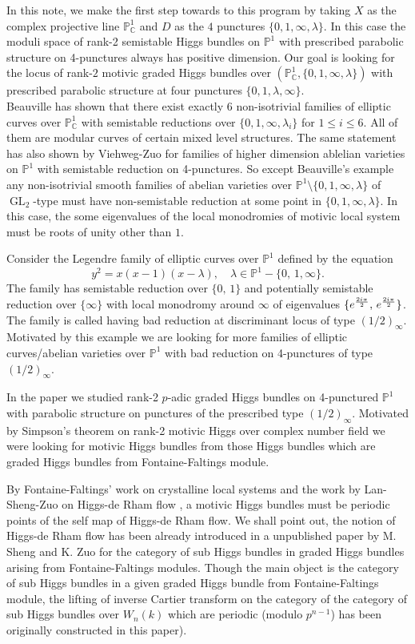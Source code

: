 \documentclass[12pt,twoside]{book}
\theoremstyle{plain}
\theoremstyle{definition}
\theoremstyle{remark}
\newcommand{\bC}{{\mathbb C}}
\newcommand{\bP}{{\mathbb P}}
\DeclareMathOperator\GL{GL}
\numberwithin{equation}{section}
\begin{document}
In this note, we make   the first step towards to this program  by taking $X$ as the complex projective line $\bP^1_{\bC}$ and $D$ as the $4$ punctures $\{0,1,\infty,\lambda\}$. In this case the moduli space  of rank-2 semistable Higgs bundles on $\mathbb P^1$ with prescribed parabolic structure on 4-punctures always has positive dimension.
Our goal is looking for the locus of rank-$2$  motivic graded Higgs bundles over $(\bP^1_{\bC},\{0,1,\infty,\lambda\})$
with prescribed parabolic structure at four punctures $\{0, 1,\lambda, \infty\}.$\\[.2cm]
Beauville \cite{Bea82} has shown that there exist exactly 6 non-isotrivial families of elliptic curves over $\bP^1_{\bC}$ with semistable reductions over $\{0,1,\infty,\lambda_i\}$ for ${1\leq i\leq 6}$. All of them are modular curves of  certain mixed level structures. The same statement has also shown by Viehweg-Zuo for families of higher dimension ablelian varieties  on $\mathbb P^1$ with semistable reduction on 4-punctures.
So except Beauville's example any non-isotrivial smooth families of abelian varieties over $\bP^1\setminus\{0,1,\infty,\lambda\}$ of $\GL_2$-type must have non-semistable reduction at some point in $\{0,1,\infty,\lambda\}$. In this case, the some eigenvalues of the local monodromies of motivic local system must be roots of unity other than $1$.

Consider the Legendre family of elliptic curves over $\mathbb P^1$ defined by the equation
\[ y^2=x(x-1)(x-\lambda),\quad \lambda \in \mathbb P^1-\{0,\,1,\infty\}.\]
The family has semistable reduction over $\{0,\, 1\}$ and potentially semistable reduction
over $\{\infty\}$ with local monodromy around $\infty$ of eigenvalues $\{e^{2i\pi \over 2},\, e^{2i\pi \over 2}\}$.
The family  is called having bad reduction at discriminant locus of type $(1/2)_\infty$. Motivated by this example
we are looking for  more families of elliptic curves/abelian varieties over $\mathbb P^1$ with bad reduction on 4-punctures of type $(1/2)_\infty$.

In the paper \cite{SYZ22} we studied rank-2 $p$-adic graded Higgs bundles on 4-punctured $\mathbb P^1$ with parabolic structure on punctures of the prescribed type $(1/2)_\infty$. Motivated by Simpson's theorem on rank-2 motivic Higgs over complex number field we were looking for motivic Higgs bundles   from  those Higgs bundles which are graded Higgs bundles from Fontaine-Faltings module.

By Fontaine-Faltings' work on crystalline local systems and the work by Lan-Sheng-Zuo on Higgs-de Rham flow \cite{LSZ19}, a motivic Higgs bundles must be periodic points of the self map of Higgs-de Rham flow.  We shall point out, the notion of Higgs-de Rham flow has been already introduced in a unpublished paper \cite{ShZu12} by M. Sheng and K. Zuo  for the category of sub Higgs bundles in graded Higgs bundles arising from Fontaine-Faltings modules. Though the main object is the category of sub Higgs bundles in a given graded Higgs bundle from Fontaine-Faltings module, the lifting of inverse Cartier transform on the category of the category of sub Higgs bundles over $W_{n}(k)$ which are periodic (modulo $p^{n-1}$) has been originally constructed in this paper).
\end{document}
